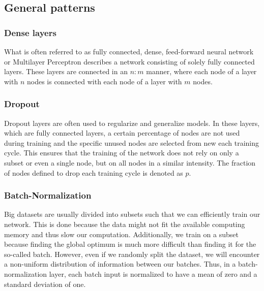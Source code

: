 \subsection{General patterns}


\subsubsection{Dense layers}
What is often referred to as fully connected, dense, feed-forward neural network or Multilayer Perceptron describes a network consisting of solely fully connected layers. These layers are connected in an $n:m$ manner, where each node of a layer with $n$ nodes is connected with each node of a layer with $m$ nodes. 

\subsubsection{Dropout}
Dropout layers are often used to regularize and generalize models. In these layers, which are fully connected layers, a certain percentage of nodes are not used during training and the specific unused nodes are selected from new each training cycle. This ensures that the training of the network does not rely on only a subset or even a single node, but on all nodes in a similar intensity. The fraction of nodes defined to drop each training cycle is denoted as $p$.

\subsubsection{Batch-Normalization}
Big datasets are usually divided into subsets such that we can efficiently train our network. This is done because the data might not fit the available computing memory and thus slow our computation. Additionally, we train on a subset because finding the global optimum is much more difficult than finding it for the so-called batch. However, even if we randomly split the dataset, we will encounter a non-uniform distribution of information between our batches. Thus, in a batch-normalization layer, each batch input is normalized to have a mean of zero and a standard deviation of one. 

